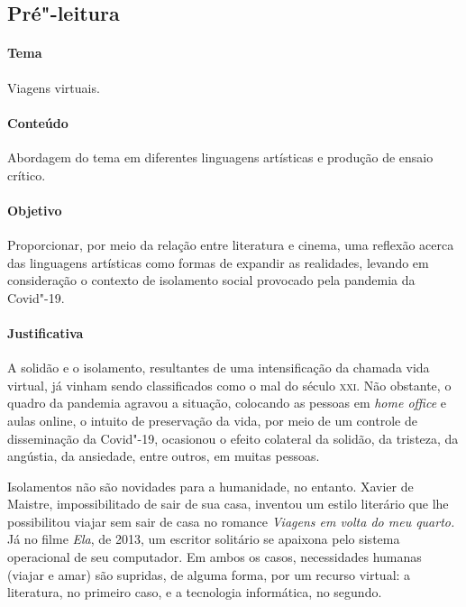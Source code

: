 \documentclass[12pt]{extarticle}
\begin{document}
\subsection{Pré"-leitura}


\paragraph{Tema} Viagens virtuais.

\paragraph{Conteúdo} Abordagem do tema em diferentes linguagens artísticas
e produção de ensaio crítico. 

\paragraph{Objetivo} Proporcionar, por meio da relação entre literatura e cinema, 
uma reflexão acerca das linguagens artísticas como formas de expandir as realidades,
levando em consideração o contexto de isolamento social provocado pela pandemia da Covid"-19.

\paragraph{Justificativa} A solidão e o isolamento, resultantes de uma intensificação
da chamada vida virtual, já vinham sendo classificados como o mal do
século \textsc{xxi}. Não obstante, o quadro da pandemia agravou a situação,
colocando as pessoas em \textit{home office} e aulas online, o intuito de
preservação da vida, por meio de um controle de disseminação da
Covid"-19, ocasionou o efeito colateral da solidão, da tristeza, da
angústia, da ansiedade, entre outros, em muitas pessoas.

Isolamentos não são novidades para a humanidade, no entanto. Xavier de 
Maistre, impossibilitado de sair de sua casa, inventou um estilo
literário que lhe possibilitou viajar sem sair de casa no romance \emph{Viagens em volta do meu quarto.}
Já no filme \emph{Ela}, de 2013, um escritor solitário se apaixona pelo 
sistema operacional de seu computador.
Em ambos os casos, necessidades humanas (viajar e amar) são
supridas, de alguma forma, por um recurso virtual: a literatura, no primeiro caso,
e a tecnologia informática, no segundo. 
\end{document}
